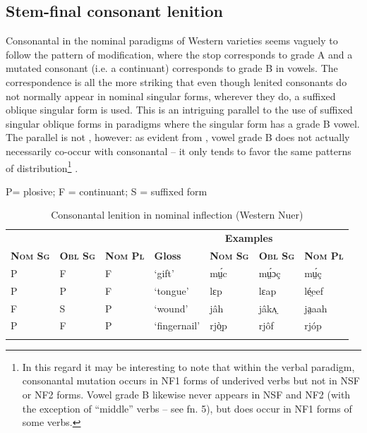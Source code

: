 \documentclass[output=paper
,newtxmath
,modfonts
,nonflat]{langsci/langscibook}
\begin{document}
\subsection{Stem-final consonant lenition}

Consonantal  in the nominal paradigms of Western  varieties seems vaguely to follow the pattern of  modification, where the stop corresponds to grade A and a mutated consonant (i.e. a continuant) corresponds to grade B in vowels.  The correspondence is all the more striking that even though lenited consonants do not normally appear in nominal singular forms, wherever they do, a suffixed oblique singular form is used.  This is an intriguing parallel to the use of suffixed singular oblique forms in paradigms where the  singular form has a grade B vowel.  The parallel is not , however: as evident from , vowel grade B does not actually necessarily co-occur with consonantal  – it only tends to favor the same patterns of distribution\footnote{In this regard it may be interesting to note that within the verbal paradigm, consonantal mutation occurs in NF1 forms of underived verbs but not in NSF or NF2 forms.  Vowel grade B likewise never appears in NSF and NF2 (with the exception of “middle” verbs – see fn. 5), but does occur in NF1 forms of some verbs.} .  

\begin{table}
P= plosive; F = continuant; S = suffixed form
\begin{tabularx}{\textwidth}{lllXlll}
\lsptoprule

 & & & \multicolumn{4}{c}{\bfseries Examples}\\
\cmidrule{4-7}
\bfseries\scshape Nom Sg & \bfseries\scshape Obl Sg & \bfseries\scshape Nom Pl &  \bfseries Gloss & \bfseries\scshape Nom Sg & \bfseries\scshape Obl Sg & \bfseries\scshape Nom Pl\\
\midrule
P & F & F & ‘gift’ & mṳ́c & mṳ́ɔç & mṳ́ç\\
P & P & F & ‘tongue’ & lɛp & lɛap & lé̤eef\\
F & S & P & ‘wound’ & jâh & jâkʌ̤ & ja̤aah\\
P & F & P & ‘fingernail’ & rjò̤p & rjôf & rjóp\\
\lspbottomrule
\end{tabularx}
\caption{Consonantal lenition in nominal inflection (Western Nuer)}
\label{tab:monich:21}
\end{table}
\end{document}
